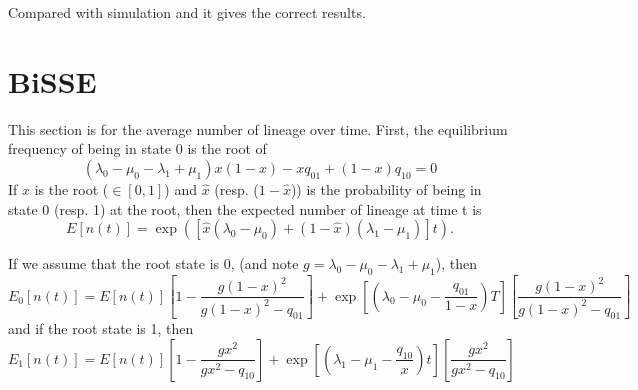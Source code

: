\documentclass[12pt]{article}
\begin{document}
Compared with simulation and it gives the correct results.

\section{BiSSE}
\label{sec:BiSSE}
This section is for the average number of lineage over time.
First, the equilibrium frequency of being in state 0 is the root of
\begin{equation*}
  (\lambda_0 - \mu_0  - \lambda_1 + \mu_1) x (1 -x)  - x q_{01} + (1 - x ) q_{10} = 0
\end{equation*}
If $\hat{x}$ is the root ($\in[0,1]$) and $\hat{x}$ (resp. ($1 - \hat{x}$)) is the probability of being in state 0 (resp. 1) at the root, then the expected number of lineage at time t is
\begin{equation*}
  E[n(t)]  = \exp \left([\hat{x} (\lambda_0 - \mu_0) +  (1 - \hat{x}) (\lambda_1 - \mu_1)]t \right).
\end{equation*}

If we assume that the root state is 0, (and note $g  = \lambda_0 - \mu_0 - \lambda_1 + \mu_1$), then
\begin{equation*}
  E_0[n(t)]  = E[n(t)] \left[ 1- \dfrac{g(1-x)^2}{g(1-x)^2 - q_{01}}\right]  + \exp[(\lambda_0 - \mu_0 - \dfrac{q_{01}}{1-x}) T] \left[\dfrac{g(1-x)^2}{g(1-x)^2 - q_{01}} \right]
\end{equation*}
%
and if the root state is 1, then
\begin{equation*}
  E_1[n(t)]  = E[n(t)] \left[ 1- \dfrac{g x^2}{g x^2 - q_{10}}\right]  + \exp[(\lambda_1 - \mu_1 - \dfrac{q_{10}}{x}) t] \left[\dfrac{g x^2}{g x^2 - q_{10}} \right]
\end{equation*}
\end{document}
